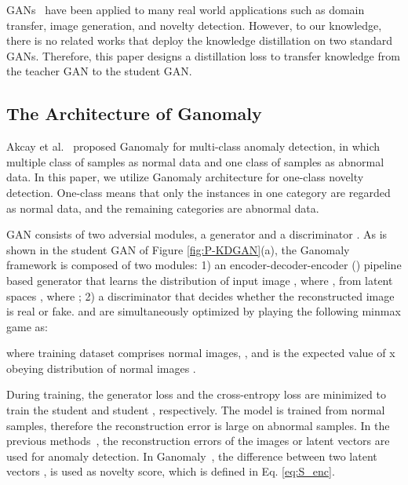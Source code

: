 \documentclass{article}
\begin{document}
	GANs~\cite{GAN:2014} have been applied to many real world applications such as domain transfer, image generation, and novelty detection. However, to our knowledge, there is no related works that deploy the knowledge distillation on two standard GANs. Therefore, this paper designs a distillation loss to transfer knowledge from the teacher GAN to the student GAN. 
	
	
	
	\subsection{The Architecture of Ganomaly}
	Akcay et al.~\cite{ganomaly:2018} proposed Ganomaly for multi-class anomaly detection, in which multiple class of samples as normal data and one class of samples as abnormal data. In this paper, we utilize Ganomaly architecture for one-class novelty detection. One-class means that only the instances in one category are regarded as normal data, and the remaining categories are abnormal data.
	
	GAN consists of two adversial modules, a generator  and a discriminator . As is shown in the student GAN of Figure \ref{fig:P-KDGAN}(a), the Ganomaly~\cite{ganomaly:2018} framework is composed of two modules: 1) an encoder-decoder-encoder () pipeline based generator  that learns the distribution of input image , where , from latent spaces , where ; 2) a discriminator  that decides whether the reconstructed image  is real or fake.  and  are simultaneously optimized by playing the following minmax game as:
	
	
	where training dataset  comprises  normal images, , and  is the expected value of x obeying distribution of normal images .
	
	During training, the generator loss  and the cross-entropy loss  are minimized to train the student  and student , respectively. The model is trained from normal samples, therefore the reconstruction error is large on abnormal samples. In the previous methods~\cite{AnoGAN:2017,EfficientGAN:2018,OCGAN:2019}, the reconstruction errors of the images or latent vectors are used for anomaly detection. In Ganomaly~\cite{ganomaly:2018}, the difference  between two latent vectors ,  is used as novelty score, which is defined in Eq. \ref{eq:S_enc}.
	
	
	
	
	
\end{document}

